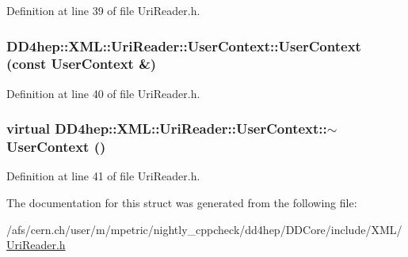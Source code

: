 Definition at line 39 of file UriReader.h.\hypertarget{struct_d_d4hep_1_1_x_m_l_1_1_uri_reader_1_1_user_context_a3597e8269b9454ec60a49b9611a5b002}{
\subsubsection[{UserContext}]{\setlength{\rightskip}{0pt plus 5cm}DD4hep::XML::UriReader::UserContext::UserContext (const {\bf UserContext} \&)}}
\label{struct_d_d4hep_1_1_x_m_l_1_1_uri_reader_1_1_user_context_a3597e8269b9454ec60a49b9611a5b002}


Definition at line 40 of file UriReader.h.\hypertarget{struct_d_d4hep_1_1_x_m_l_1_1_uri_reader_1_1_user_context_afabe7889ca4e26019a3108850361287e}{
\subsubsection[{$\sim$UserContext}]{\setlength{\rightskip}{0pt plus 5cm}virtual DD4hep::XML::UriReader::UserContext::$\sim$UserContext ()}}
\label{struct_d_d4hep_1_1_x_m_l_1_1_uri_reader_1_1_user_context_afabe7889ca4e26019a3108850361287e}


Definition at line 41 of file UriReader.h.

The documentation for this struct was generated from the following file:\begin{DoxyCompactItemize}
\item 
/afs/cern.ch/user/m/mpetric/nightly\_\-cppcheck/dd4hep/DDCore/include/XML/\hyperlink{_uri_reader_8h}{UriReader.h}\end{DoxyCompactItemize}
